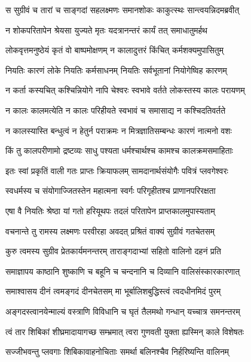 
\twolineshloka
{स सुग्रीवं च तारां च साङ्गदां सहलक्ष्मणः}
{समानशोकः काकुत्स्थः सान्त्वयन्निदमब्रवीत्} %

\twolineshloka
{न शोकपरितापेन श्रेयसा युज्यते मृतः}
{यदत्रानन्तरं कार्यं तत् समाधातुमर्हथ} %

\twolineshloka
{लोकवृत्तमनुष्ठेयं कृतं वो बाष्पमोक्षणम्}
{न कालादुत्तरं किंचित् कर्मशक्यमुपासितुम्} %

\twolineshloka
{नियतिः कारणं लोके नियतिः कर्मसाधनम्}
{नियतिः सर्वभूतानां नियोगेष्विह कारणम्} %

\twolineshloka
{न कर्ता कस्यचित् कश्चिन्नियोगे नापि चेश्वरः}
{स्वभावे वर्तते लोकस्तस्य कालः परायणम्} %

\twolineshloka
{न कालः कालमत्येति न कालः परिहीयते}
{स्वभावं च समासाद्य न कश्चिदतिवर्तते} %

\twolineshloka
{न कालस्यास्ति बन्धुत्वं न हेतुर्न पराक्रमः}
{न मित्रज्ञातिसम्बन्धः कारणं नात्मनो वशः} %

\twolineshloka
{किं तु कालपरीणामो द्रष्टव्यः साधु पश्यता}
{धर्मश्चार्थश्च कामश्च कालक्रमसमाहिताः} %

\twolineshloka
{इतः स्वां प्रकृतिं वाली गतः प्राप्तः क्रियाफलम्}
{सामदानार्थसंयोगैः पवित्रं प्लवगेश्वरः} %

\twolineshloka
{स्वधर्मस्य च संयोगाज्जितस्तेन महात्मना}
{स्वर्गः परिगृहीतश्च प्राणानपरिरक्षता} %

\twolineshloka
{एषा वै नियतिः श्रेष्ठा यां गतो हरियूथपः}
{तदलं परितापेन प्राप्तकालमुपास्यताम्} %

\twolineshloka
{वचनान्ते तु रामस्य लक्ष्मणः परवीरहा}
{अवदत् प्रश्रितं वाक्यं सुग्रीवं गतचेतसम्} %

\twolineshloka
{कुरु त्वमस्य सुग्रीव प्रेतकार्यमनन्तरम्}
{ताराङ्गदाभ्यां सहितो वालिनो दहनं प्रति} %

\twolineshloka
{समाज्ञापय काष्ठानि शुष्काणि च बहूनि च}
{चन्दनानि च दिव्यानि वालिसंस्कारकारणात्} %

\twolineshloka
{समाश्वासय दीनं त्वमङ्गदं दीनचेतसम्}
{मा भूर्बालिशबुद्धिस्त्वं त्वदधीनमिदं पुरम्} %

\twolineshloka
{अङ्गदस्त्वानयेन्माल्यं वस्त्राणि विविधानि च}
{घृतं तैलमथो गन्धान् यच्चात्र समनन्तरम्} %

\twolineshloka
{त्वं तार शिबिकां शीघ्रमादायागच्छ सम्भ्रमात्}
{त्वरा गुणवती युक्ता ह्यस्मिन् काले विशेषतः} %

\twolineshloka
{सज्जीभवन्तु प्लवगाः शिबिकावाहनोचिताः}
{समर्था बलिनश्चैव निर्हरिष्यन्ति वालिनम्} %


